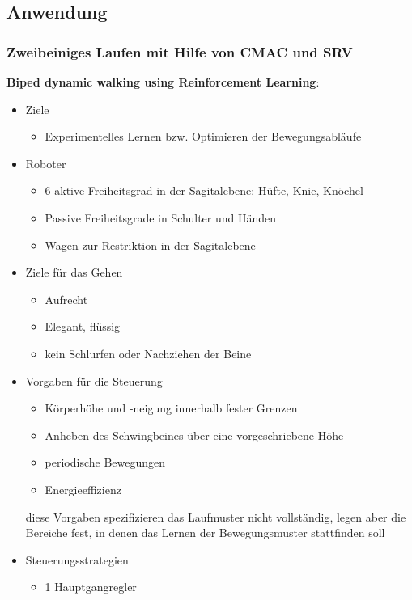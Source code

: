 \subsection{Anwendung}


\subsubsection{Zweibeiniges Laufen mit Hilfe von CMAC und SRV}

\textbf{Biped dynamic walking using Reinforcement Learning}:\\
\begin{itemize}
	\item Ziele
	\begin{itemize}
		\item Experimentelles Lernen bzw. Optimieren der Bewegungsabläufe	
	\end{itemize}
	\item Roboter
	\begin{itemize}
		\item 6 aktive Freiheitsgrad in der Sagitalebene: Hüfte, Knie, Knöchel
		\item Passive Freiheitsgrade in Schulter und Händen
		\item Wagen zur Restriktion in der Sagitalebene
	\end{itemize}
	\item Ziele für das Gehen
	\begin{itemize}
		\item Aufrecht
		\item Elegant, flüssig
		\item kein Schlurfen oder Nachziehen der Beine
	\end{itemize}
	\item Vorgaben für die Steuerung
	\begin{itemize}
		\item Körperhöhe und -neigung innerhalb fester Grenzen
		\item Anheben des Schwingbeines über eine vorgeschriebene Höhe
		\item periodische Bewegungen
		\item Energieeffizienz
	\end{itemize}
	diese Vorgaben spezifizieren das Laufmuster nicht vollständig, legen aber die Bereiche fest, in denen das Lernen der Bewegungsmuster stattfinden soll
	\item Steuerungsstrategien
	\begin{itemize}
		\item 1 Hauptgangregler

\end{itemize}
\end{itemize}
